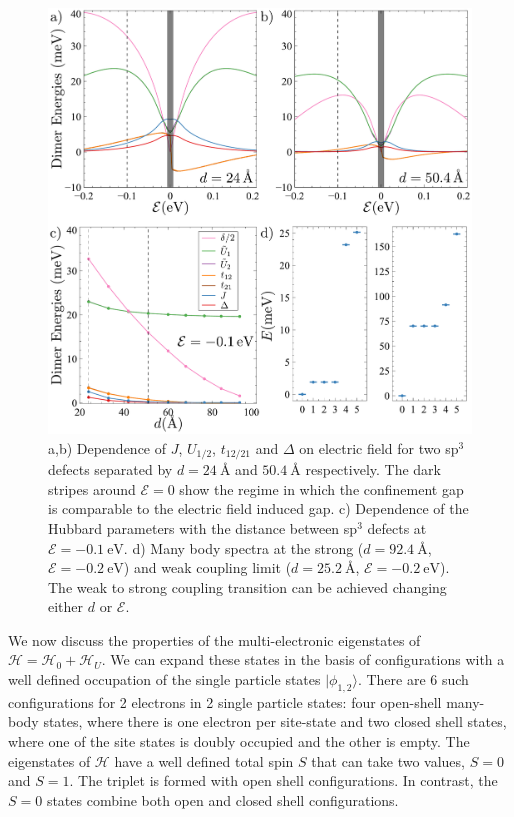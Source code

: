 \begin{figure}[h!]
\centering
\includegraphics{designer/figures/fig_blue.pdf}
\vspace{-5pt}
\caption{a,b) Dependence of $J$, $U_{1/2}$, $t_{12/21}$ and $\Delta$ on electric field for two sp$^3$ defects separated by $d=\SI{24}{\angstrom}$ and $\SI{50.4}{\angstrom}$ respectively. The dark stripes around $\mathcal{E}=0$ show the regime in which the confinement gap is comparable to the electric field induced gap. c) Dependence of the Hubbard parameters with the distance between sp$^3$ defects at $\mathcal{E}=\SI{-0.1}{\eV}$. d) Many body spectra at the strong ($d=\SI{92.4}{\angstrom}$, $\mathcal{E}=\SI{-0.2}{\eV}$) and weak coupling limit ($d=\SI{25.2}{\angstrom}$, $\mathcal{E}= \SI{-0.2}{\eV}$). The weak to strong coupling transition can be achieved changing either $d$ or $\mathcal{E}$.}
\label{blue_params}
\end{figure}

We now discuss the properties of the multi-electronic eigenstates of $\mathcal{H}= \mathcal{H}_0+\mathcal{H}_U$.
We can expand these states in the basis of configurations with a well defined occupation of the single particle states $|\phi_{1,2}\rangle$. There are 6 such configurations for 2 electrons in 2 single particle states: four open-shell 
many-body states, where there is one electron per site-state and two closed shell states, where one of the site states is doubly occupied and the other is empty. The eigenstates of $\mathcal{H}$ have a well defined total spin $S$ that can take two values, $S=0$ and $S=1$. The triplet is formed with open shell configurations.
In contrast, the $S=0$ states combine both open and closed shell configurations.


